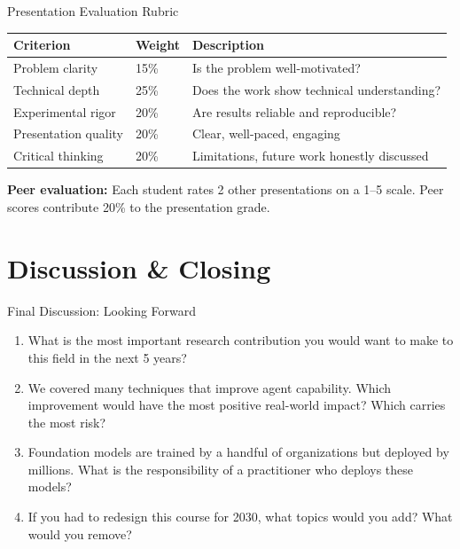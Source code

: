 \documentclass[aspectratio=169,10pt]{beamer}
\begin{document}
\begin{frame}{Presentation Evaluation Rubric}
  \begin{center}
  \begin{tabular}{lll}
    \toprule
    \textbf{Criterion} & \textbf{Weight} & \textbf{Description} \\
    \midrule
    Problem clarity & 15\% & Is the problem well-motivated? \\
    Technical depth & 25\% & Does the work show technical understanding? \\
    Experimental rigor & 20\% & Are results reliable and reproducible? \\
    Presentation quality & 20\% & Clear, well-paced, engaging \\
    Critical thinking & 20\% & Limitations, future work honestly discussed \\
    \bottomrule
  \end{tabular}
  \end{center}
  \vspace{0.3em}
  \textbf{Peer evaluation:} Each student rates 2 other presentations on a 1–5 scale.
  Peer scores contribute 20\% to the presentation grade.
\end{frame}

\section{Discussion \& Closing}
\begin{frame}{Final Discussion: Looking Forward}
  \begin{enumerate}
    \item What is the most important research contribution you would want to make to this field in the next 5 years?
    \item We covered many techniques that improve agent capability. Which improvement would have the most positive real-world impact? Which carries the most risk?
    \item Foundation models are trained by a handful of organizations but deployed by millions. What is the responsibility of a practitioner who deploys these models?
    \item If you had to redesign this course for 2030, what topics would you add? What would you remove?
  \end{enumerate}
\end{frame}
\end{document}
